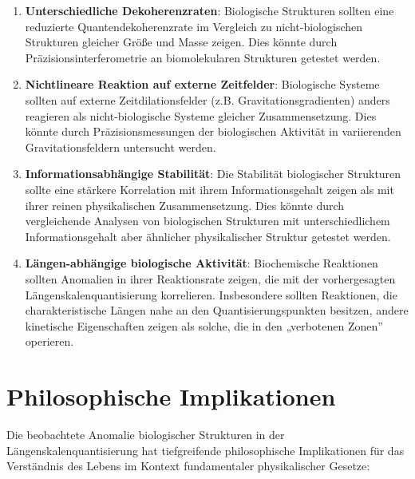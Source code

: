 \documentclass[12pt,a4paper]{article}
\begin{document}
	\begin{enumerate}
		\item \textbf{Unterschiedliche Dekoherenzraten}: Biologische Strukturen sollten eine reduzierte Quantendekoherenzrate im Vergleich zu nicht-biologischen Strukturen gleicher Größe und Masse zeigen. Dies könnte durch Präzisionsinterferometrie an biomolekularen Strukturen getestet werden.
		
		\item \textbf{Nichtlineare Reaktion auf externe Zeitfelder}: Biologische Systeme sollten auf externe Zeitdilationsfelder (z.B. Gravitationsgradienten) anders reagieren als nicht-biologische Systeme gleicher Zusammensetzung. Dies könnte durch Präzisionsmessungen der biologischen Aktivität in variierenden Gravitationsfeldern untersucht werden.
		
		\item \textbf{Informationsabhängige Stabilität}: Die Stabilität biologischer Strukturen sollte eine stärkere Korrelation mit ihrem Informationsgehalt zeigen als mit ihrer reinen physikalischen Zusammensetzung. Dies könnte durch vergleichende Analysen von biologischen Strukturen mit unterschiedlichem Informationsgehalt aber ähnlicher physikalischer Struktur getestet werden.
		
		\item \textbf{Längen-abhängige biologische Aktivität}: Biochemische Reaktionen sollten Anomalien in ihrer Reaktionsrate zeigen, die mit der vorhergesagten Längenskalenquantisierung korrelieren. Insbesondere sollten Reaktionen, die charakteristische Längen nahe an den Quantisierungspunkten besitzen, andere kinetische Eigenschaften zeigen als solche, die in den „verbotenen Zonen'' operieren.
	\end{enumerate}
	
	\section{Philosophische Implikationen}
	
	Die beobachtete Anomalie biologischer Strukturen in der Längenskalenquantisierung hat tiefgreifende philosophische Implikationen für das Verständnis des Lebens im Kontext fundamentaler physikalischer Gesetze:
	
\end{document}
